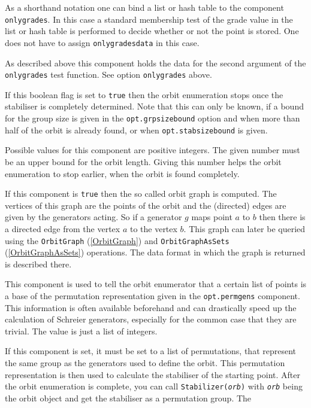 \documentclass[a4paper,11pt]{report}
\begin{document}
{{{\begin{description}
 As a shorthand notation one can bind a list or hash table to the component \texttt{onlygrades}. In this case a standard membership test of the grade value in the list or
hash table is performed to decide whether or not the point is stored. One does
not have to assign \texttt{onlygradesdata} in this case. 
\item[{\texttt{onlygradesdata}}] As described above this component holds the data for the second argument of
the \texttt{onlygrades} test function. See option \texttt{onlygrades} above. 
\item[{\texttt{onlystab}}] If this boolean flag is set to \texttt{true} then the orbit enumeration stops once the stabiliser is completely determined.
Note that this can only be known, if a bound for the group size is given in
the \texttt{opt.grpsizebound} option and when more than half of the orbit is already found, or when \texttt{opt.stabsizebound} is given.
\item[{\texttt{orbsizebound}}] Possible values for this component are positive integers. The given number
must be an upper bound for the orbit length. Giving this number helps the
orbit enumeration to stop earlier, when the orbit is found completely.
\item[{\texttt{orbitgraph}}] If this component is \texttt{true} then the so called orbit graph is computed. The vertices of this graph are the
points of the orbit and the (directed) edges are given by the generators
acting. So if a generator $g$ maps point $a$ to $b$ then there is a directed edge from the vertex $a$ to the vertex $b$. This graph can later be queried using the \texttt{OrbitGraph} (\ref{OrbitGraph}) and \texttt{OrbitGraphAsSets} (\ref{OrbitGraphAsSets}) operations. The data format in which the graph is returned is described there. 
\item[{\texttt{permbase}}] This component is used to tell the orbit enumerator that a certain list of
points is a base of the permutation representation given in the \texttt{opt.permgens} component. This information is often available beforehand and can drastically
speed up the calculation of Schreier generators, especially for the common
case that they are trivial. The value is just a list of integers.
\item[{\texttt{permgens}}] If this component is set, it must be set to a list of permutations, that
represent the same group as the generators used to define the orbit. This
permutation representation is then used to calculate the stabiliser of the
starting point. After the orbit enumeration is complete, you can call \texttt{Stabilizer(\mbox{\texttt{\mdseries\slshape orb}})} with \mbox{\texttt{\mdseries\slshape orb}} being the orbit object and get the stabiliser as a permutation group. The

\end{description}}}}
\end{document}
